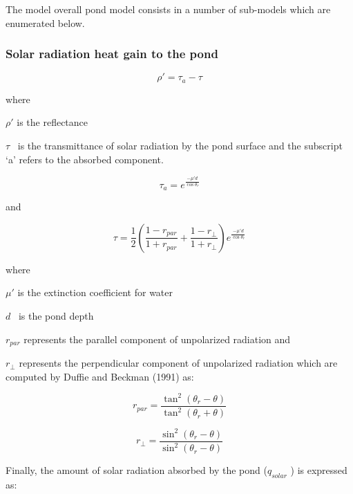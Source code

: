 The model overall pond model consists in a number of sub-models which are enumerated below.

\subsubsection{Solar radiation heat gain to the pond}\label{solar-radiation-heat-gain-to-the-pond}

\begin{equation}
\rho ' = {\tau_a} - \tau
\end{equation}

where

\(\rho '\) is the reflectance

\(\tau\) ~is the transmittance of solar radiation by the pond surface and the subscript `a' refers to the absorbed component.

\begin{equation}
{\tau_a} = {e^{\frac{{ - \mu 'd}}{{\cos {\theta_r}}}}}
\end{equation}

and

\begin{equation}
\tau  = \frac{1}{2}\left( {\frac{{1 - {r_{par}}}}{{1 + {r_{par}}}} + \frac{{1 - {r_ \bot }}}{{1 + {r_ \bot }}}} \right){e^{\frac{{ - \mu 'd}}{{\cos {\theta_r}}}}}
\end{equation}

where

\(\mu '\) is the extinction coefficient for water

\(d\) ~is the pond depth

\({r_{par}}\) represents the parallel component of unpolarized radiation and

\({r_ \bot }\) represents the perpendicular component of unpolarized radiation which are computed by Duffie and Beckman (1991) as:

\begin{equation}
  r_{par} = \frac{\tan ^2 \left( \theta_r - \theta \right)}{\tan ^2 \left( \theta_r + \theta \right)}
\end{equation}

\begin{equation}
  r_{\bot} = \frac{\sin ^2 \left( \theta_r - \theta \right)}{\sin ^2 \left( \theta_r - \theta  \right)}
\end{equation}

Finally, the amount of solar radiation absorbed by the pond (\({q_{solar}}\) ) is expressed as:

